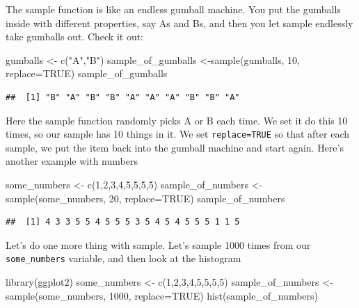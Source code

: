 \documentclass[
]{book}
\newenvironment{Shaded}{\begin{snugshade}}{\end{snugshade}}
\newcommand{\AttributeTok}[1]{\textcolor[rgb]{0.77,0.63,0.00}{#1}}
\newcommand{\ConstantTok}[1]{\textcolor[rgb]{0.00,0.00,0.00}{#1}}
\newcommand{\DecValTok}[1]{\textcolor[rgb]{0.00,0.00,0.81}{#1}}
\newcommand{\FunctionTok}[1]{\textcolor[rgb]{0.00,0.00,0.00}{#1}}
\newcommand{\NormalTok}[1]{#1}
\newcommand{\OtherTok}[1]{\textcolor[rgb]{0.56,0.35,0.01}{#1}}
\newcommand{\StringTok}[1]{\textcolor[rgb]{0.31,0.60,0.02}{#1}}
\begin{document}
The sample function is like an endless gumball machine. You put the gumballs inside with different properties, say As and Bs, and then you let sample endlessly take gumballs out. Check it out:

\begin{Shaded}
\begin{Highlighting}[]
\NormalTok{gumballs }\OtherTok{\textless{}{-}} \FunctionTok{c}\NormalTok{(}\StringTok{"A"}\NormalTok{,}\StringTok{"B"}\NormalTok{)}
\NormalTok{sample\_of\_gumballs }\OtherTok{\textless{}{-}}\FunctionTok{sample}\NormalTok{(gumballs, }\DecValTok{10}\NormalTok{, }\AttributeTok{replace=}\ConstantTok{TRUE}\NormalTok{)}
\NormalTok{sample\_of\_gumballs}
\end{Highlighting}
\end{Shaded}

\begin{verbatim}
##  [1] "B" "A" "B" "B" "A" "A" "A" "B" "B" "A"
\end{verbatim}

Here the sample function randomly picks A or B each time. We set it do this 10 times, so our sample has 10 things in it. We set \texttt{replace=TRUE} so that after each sample, we put the item back into the gumball machine and start again. Here's another example with numbers

\begin{Shaded}
\begin{Highlighting}[]
\NormalTok{some\_numbers }\OtherTok{\textless{}{-}} \FunctionTok{c}\NormalTok{(}\DecValTok{1}\NormalTok{,}\DecValTok{2}\NormalTok{,}\DecValTok{3}\NormalTok{,}\DecValTok{4}\NormalTok{,}\DecValTok{5}\NormalTok{,}\DecValTok{5}\NormalTok{,}\DecValTok{5}\NormalTok{,}\DecValTok{5}\NormalTok{)}
\NormalTok{sample\_of\_numbers }\OtherTok{\textless{}{-}}\FunctionTok{sample}\NormalTok{(some\_numbers, }\DecValTok{20}\NormalTok{, }\AttributeTok{replace=}\ConstantTok{TRUE}\NormalTok{)}
\NormalTok{sample\_of\_numbers}
\end{Highlighting}
\end{Shaded}

\begin{verbatim}
##  [1] 4 3 3 5 5 4 5 5 5 3 5 4 5 4 5 5 5 1 1 5
\end{verbatim}

Let's do one more thing with sample. Let's sample 1000 times from our \texttt{some\_numbers} variable, and then look at the histogram

\begin{Shaded}
\begin{Highlighting}[]
\FunctionTok{library}\NormalTok{(ggplot2)}
\NormalTok{some\_numbers }\OtherTok{\textless{}{-}} \FunctionTok{c}\NormalTok{(}\DecValTok{1}\NormalTok{,}\DecValTok{2}\NormalTok{,}\DecValTok{3}\NormalTok{,}\DecValTok{4}\NormalTok{,}\DecValTok{5}\NormalTok{,}\DecValTok{5}\NormalTok{,}\DecValTok{5}\NormalTok{,}\DecValTok{5}\NormalTok{)}
\NormalTok{sample\_of\_numbers }\OtherTok{\textless{}{-}}\FunctionTok{sample}\NormalTok{(some\_numbers, }\DecValTok{1000}\NormalTok{, }\AttributeTok{replace=}\ConstantTok{TRUE}\NormalTok{)}
\FunctionTok{hist}\NormalTok{(sample\_of\_numbers)}
\end{Highlighting}
\end{Shaded}
\end{document}
